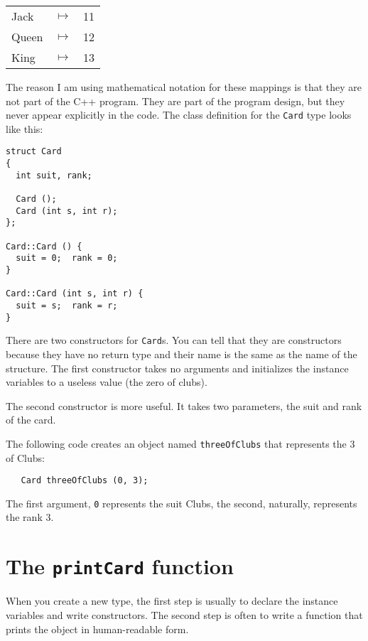 \vspace{0.1in}
\begin{tabular}{l c l}
Jack & $\mapsto$ & 11 \\
Queen & $\mapsto$ & 12 \\
King & $\mapsto$ & 13 \\
\end{tabular}
\vspace{0.1in}

The reason I am using mathematical notation for these mappings is
that they are not part of the C++ program.  They are part of the
program design, but they never appear explicitly in the code.
The class definition for the {\tt Card} type looks like this:

\begin{verbatim}
struct Card
{
  int suit, rank;

  Card ();
  Card (int s, int r);
};

Card::Card () { 
  suit = 0;  rank = 0;
}

Card::Card (int s, int r) { 
  suit = s;  rank = r;
}
\end{verbatim}
%
There are two constructors for {\tt Card}s.  You can tell that
they are constructors because they have no return type and their
name is the same as the name of the structure.  The first
constructor takes no arguments and initializes the instance
variables to a useless value (the zero of clubs).

The second constructor is more useful.  It takes two parameters,
the suit and rank of the card.


The following code creates an object named {\tt threeOfClubs}
that represents
the 3 of Clubs:

\begin{verbatim}
   Card threeOfClubs (0, 3);
\end{verbatim}
%
The first argument, {\tt 0} represents the suit Clubs, the
second, naturally, represents the rank 3.

\section{The {\tt printCard} function}

When you create a new type, the first step is usually to declare the
instance variables and write constructors.  The second step is often
to write a function that prints the object in human-readable form.


